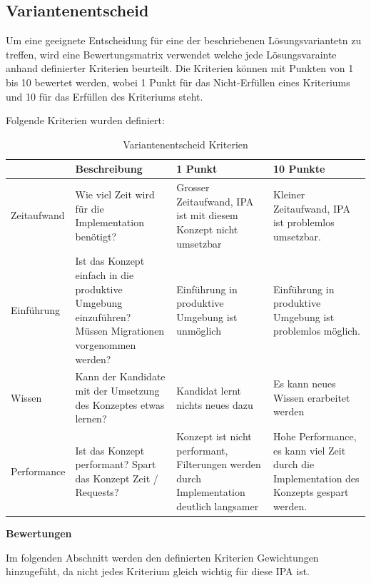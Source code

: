 \newpage

\subsection{Variantenentscheid}

Um eine geeignete Entscheidung für eine der beschriebenen Lösungsvariantetn zu treffen, wird eine Bewertungsmatrix verwendet welche
jede Lösungsvarainte anhand definierter Kriterien beurteilt. Die Kriterien können mit Punkten von 1 bis 10 bewertet werden, wobei 1 Punkt für das Nicht-Erfüllen
eines Kriteriums und 10 für das Erfüllen des Kriteriums steht. 

Folgende Kriterien wurden definiert:

\begin{table}[h!]
   \begin{tabular}{|L{0.2\textwidth}|L{0.3\textwidth}|L{0.2\textwidth}|L{0.2\textwidth}|}
      \hline
       & \color{white}\textbf{Beschreibung} & \color{white}\textbf{1 Punkt} & \color{white}\textbf{10 Punkte} \\[2pt]
      \hline
      Zeitaufwand & Wie viel Zeit wird für die Implementation benötigt? 
      & Grosser Zeitaufwand, IPA ist mit diesem Konzept nicht umsetzbar & Kleiner Zeitaufwand, IPA ist problemlos umsetzbar. \\
      \hline
      Einführung & Ist das Konzept einfach in die produktive Umgebung einzuführen? Müssen Migrationen vorgenommen werden?
       & Einführung in produktive Umgebung ist unmöglich & Einführung in produktive Umgebung ist problemlos möglich.\\
      \hline
      Wissen & Kann der Kandidate mit der Umsetzung des Konzeptes etwas lernen?
      & Kandidat lernt nichts neues dazu & Es kann neues Wissen erarbeitet werden\\
      \hline
      Performance & Ist das Konzept performant? Spart das Konzept Zeit / Requests? 
      & Konzept ist nicht performant, Filterungen werden durch Implementation deutlich langsamer 
      & Hohe Performance, es kann viel Zeit durch die Implementation des Konzepts gespart werden.\\
      \hline
   \end{tabular}
   \caption{Variantenentscheid Kriterien}
\end{table}

\newpage{}

\textbf{Bewertungen}

Im folgenden Abschnitt werden den definierten Kriterien Gewichtungen hinzugefüht, da nicht jedes Kriterium gleich wichtig für
diese IPA ist.

